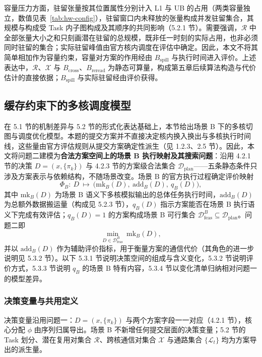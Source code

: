 容量压力方面，驻留张量按其位置属性分别计入 L1 与 UB 的占用（两类容量独立，数值见表~\ref{tab:hw-config}），驻留窗口内未释放的张量构成并发驻留集合，其规模与构成受 Task 内子图构成及其顺序的共同影响（5.2.1 节）。需要强调，$\mathcal{R}$ 中全部张量大小之和只刻画潜在驻留的总规模，既非任一时刻的实际占用，也非必须同时驻留的集合；实际驻留峰值由官方核内调度在评估中确定。因此，本文不将其简单相加作为容量约束，容量对方案的作用经由 $B_{\mathrm{spill}}$ 与执行时间进入评价。上述表达中，$\mathcal{R}$、$\mathcal{X}$ 与 $B_{\mathrm{cross}}$、$B_{\mathrm{reread}}$ 为静态可算量，构成第五章后续算法构造与代价估计的直接依据；$B_{\mathrm{spill}}$ 与实际驻留经由评价获得。

\subsection{缓存约束下的多核调度模型}
在 5.1 节的机制差异与 5.2 节的形式化表达基础上，本节给出场景 B 下的多核切图与调度优化模型。本题的提交方案并不直接决定核内换入换出与多核执行时间线，这些量由官方评估规则从提交方案确定性派生（见 1.2.3、2.5 节）。因此，本文将问题二建模为\textbf{合法方案空间上的场景 B 执行映射及其搜索问题}：沿用 4.2.1 节的决策 $D=(x,\{\pi_k\})$ 与 4.2.3 节的方案级合法集合 $\mathcal{D}_{\mathrm{plan}}$——五条静态条件只涉及方案表示与依赖结构，不随场景改变。场景 B 的官方执行过程确定评价映射
\[ \Phi_B:\ D\ \mapsto\ \bigl(\mathrm{mk}_B(D),\ \mathrm{add}_B(D),\ q_B(D)\bigr), \]
其中 $\mathrm{mk}_B(D)$ 为场景 B 语义下多核模拟输出的总体任务执行时间，$\mathrm{add}_B(D)$ 为总额外数据搬运量（构成见 5.2.3 节），$q_B(D)$ 指示方案能否在场景 B 执行语义下完成有效评估；$q_B(D)=1$ 的方案构成场景 B 可行集合 $\mathcal{D}_{\mathrm{feas}}^{B}\subseteq\mathcal{D}_{\mathrm{plan}}$。问题二即
\begin{equation}\label{eq:q2-object}
\min_{D\in\mathcal{D}_{\mathrm{feas}}^{B}}\ \mathrm{mk}_B(D),
\end{equation}
并以 $\mathrm{add}_B(D)$ 作为辅助评价指标，用于衡量方案的通信代价（其角色的进一步说明见 5.3.2 节）。以下 5.3.1 节说明决策空间的组成与含义变化，5.3.2 节说明评价方式，5.3.3 节说明 $q_B$ 的场景 B 特有内容，5.3.4 节以变化清单归纳相对问题一的模型差异。

\subsubsection{决策变量与共用定义}
决策变量沿用问题一：$D=(x,\{\pi_k\})$ 与两个方案字段一一对应（4.2.1 节），核心分配 $\phi$ 由序列归属导出。场景 B 不新增任何提交层面的决策变量；5.2 节的 Task 划分、潜在复用对集合 $\mathcal{R}$、跨核通信对集合 $\mathcal{X}$ 与通路集合 $\{\mathcal{L}_t\}$ 均为方案导出的派生量。

